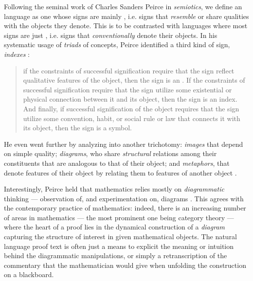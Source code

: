 Following the seminal work of Charles Sanders Peirce in
\emph{semiotics}, we define an  language as one
whose signs are mainly , i.e. signs that \emph{resemble} or share
qualities with the objects they denote. This is to be contrasted with
 languages where most signs are just , i.e.
signs that \emph{conventionally} denote their objects. In his systematic usage
of \emph{triads} of concepts, Peirce identified a third kind of sign,
\emph{indexes} :
\begin{quote}
  if the constraints of successful signification require that the sign reflect
  qualitative features of the object, then the sign is an . If the
  constraints of successful signification require that the sign utilize some
  existential or physical connection between it and its object, then the sign is
  an index. And finally, if successful signification of the object requires that
  the sign utilize some convention, habit, or social rule or law that connects
  it with its object, then the sign is a symbol.
\end{quote}
He even went further by analyzing  into another
trichotomy:
\emph{images} that depend on simple quality; \emph{diagrams}, who share
\emph{structural} relations among their constituents that are analogous to that
of their object; and \emph{metaphors}, that denote features of their object by
relating them to features of another object .

Interestingly, Peirce held that mathematics relies mostly on \emph{diagrammatic}
thinking --- observation of, and experimentation on, diagrams
. This agrees with the contemporary
practice of mathematics: indeed, there is an increasing number of areas in
mathematics --- the most prominent one being category theory --- where the heart
of a proof lies in the dynamical construction of a \emph{diagram} capturing the
structure of interest in given mathematical objects. The natural language proof
text is often just a means to explicit the meaning or intuition behind the
diagrammatic manipulations, or simply a retranscription of the commentary that
the mathematician would give when unfolding the construction on a blackboard.

